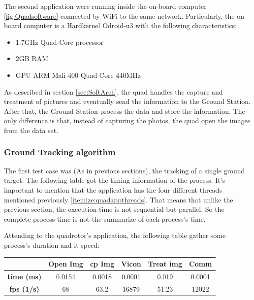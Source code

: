 	The second application were running inside the on-board computer \ref{fig:Quadsoftware} connected by WiFi to the same network. Particularly, the on-board computer is a Hardkernel Odroid-u3 with the following characteristics:
	
	
	\begin{itemize}
		\item 1.7GHz Quad-Core processor 
		\item 2GB RAM
		\item GPU ARM Mali-400 Quad Core 440MHz  
	\end{itemize}
	
	As described in section \ref{sec:SoftArch}, the quad handles the capture and treatment of pictures and eventually send the information to the Ground Station. After that, the Ground Station process the data and store the information. The only difference is that, instead of capturing the photos, the quad open the images from the data set.
	
	
	\subsubsection{Ground Tracking algorithm}
	
	The first test case was (As in previous sections), the tracking of a single ground target. The following table got the timing information of the process. It's important to mention that the application has the four different threads mentioned previously \ref{itemize:quadappthreads}. That means that unlike the previous section, the execution time is not sequential but parallel. So the complete process time is not the summarize of each process's time.
	
	Attending to the quadrotor's application, the following table gather some process's duration and it speed:
	\newline
	\newline
	{
	\centering
		\begin{tabular}{|c|c|c|c|c|c|}
		\hline  					&  Open Img	&  cp Img 	& Vicon 	& Treat img & Comm  		\\ 
		\hline  \textbf{time (ms)}	& 	0.0154	& 0.0018	&	0.0001	&  	 0.019	&	0.0001		\\ 
		\hline  \textbf{fps (1/s)}	&  	68		&  63.2		&  16879	&  	51.23	&	12022		\\ 
		\hline 
		\end{tabular} 
	}
	\newline
	
